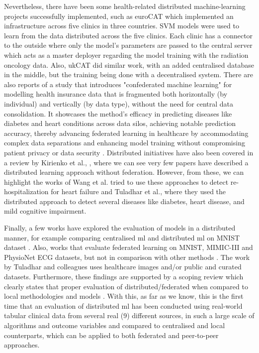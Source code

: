 Nevertheless, there have been some health-related distributed machine-learning projects successfully implemented, such as euroCAT \cite{eurocat} which implemented an infrastructure across five clinics in three countries. SVM models were used to learn from the data distributed across the five clinics. Each clinic has a connector to the outside where only the model's parameters are passed to the central server which acts as a master deployer regarding the model training with the radiation oncology data. Also, ukCAT \cite{ukcat} did similar work, with an added centralised database in the middle, but the training being done with a decentralised system. There are also reports of a study that introduces "confederated machine learning" for modelling health insurance data that is fragmented both horizontally (by individual) and vertically (by data type), without the need for central data consolidation. It showcases the method's efficacy in predicting diseases like diabetes and heart conditions across data silos, achieving notable prediction accuracy, thereby advancing federated learning in healthcare by accommodating complex data separations and enhancing model training without compromising patient privacy or data security \cite{liuConfederatedLearningHealthcare2022}. Distributed initiatives have also been covered in a review by Kirienko et al., \cite{kirienkoDistributedLearningReliable2021a}, where we can see very few papers have described a distributed learning approach without federation. However, from these, we can highlight the works of Wang et al. \cite{wangFastDivideandconquerSparse2019} tried to use these approaches to detect re-hospitalization for heart failure and Tuladhar et al., \cite{distributed} where they used the distributed approach to detect several diseases like diabetes, heart disease, and mild cognitive impairment.

Finally, a few works have explored the evaluation of models in a distributed manner, for example comparing  centralised \ac{ml} and distributed \ac{ml} on MNIST dataset \cite{performance_evaluation_1}. Also, works that evaluate federated learning on MNIST, MIMIC-III and PhysioNet ECG datasets, but not in comparison with other methods \cite{performance_evaluation_2}. The work by Tuladhar and colleagues \cite{distributed} uses healthcare images and/or public and curated datasets. Furthermore, these findings are supported by a scoping review which clearly states that proper  evaluation of distributed/federated when compared to local methodologies and models \cite{liFederatedDistributedLearning2023}. With this, as far as we know, this is the first time that an evaluation of distributed \ac{ml} has been conducted using real-world tabular clinical data from several real (9) different sources, in such a large scale of algorithms and outcome variables and compared to centralised and local counterparts, which can be applied to both federated and peer-to-peer approaches.
